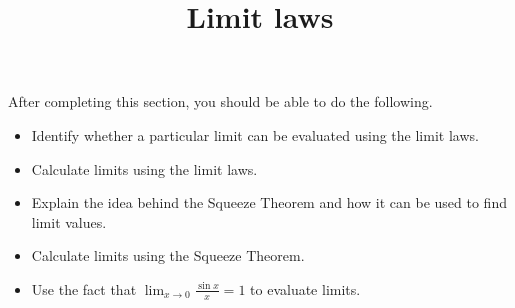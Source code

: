 \documentclass{ximera}
\title{Limit laws}
\begin{document}
\begin{abstract}
\end{abstract}

\maketitle

\begin{sectionOutcomes}
After completing this section, you should be able to do the following.

\begin{itemize}
\item Identify whether a particular limit can be evaluated using the limit laws.
\item Calculate limits using the limit laws. 
\item Explain the idea behind the Squeeze Theorem and how it can be used to find limit values.
\item Calculate limits using the Squeeze Theorem.
\item Use the fact that $\lim_{x \to 0} \frac{\sin x}{x} = 1$ to evaluate limits.
\end{itemize}
\end{sectionOutcomes}
\end{document}

